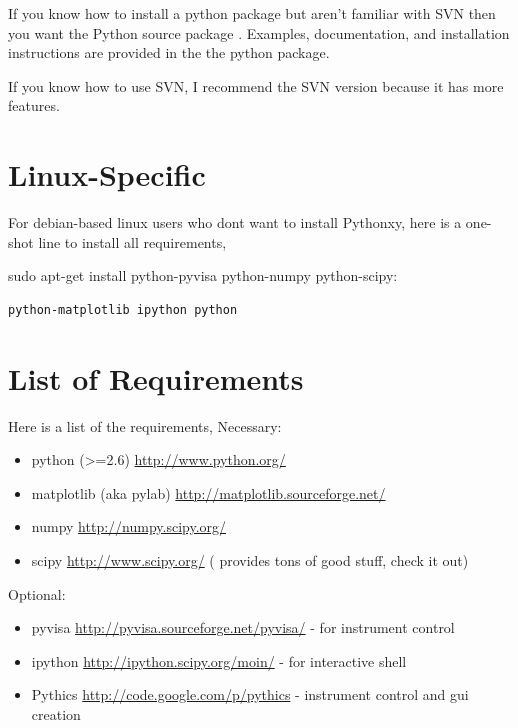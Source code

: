 \documentclass[letterpaper,10pt,english]{sphinxmanual}
\begin{document}
If you know how to install a python package but aren't familiar with SVN then you want the Python source package . Examples, documentation, and installation instructions are provided in the the python package.

If you know how to use SVN, I recommend the SVN version because it has more features.


\section{Linux-Specific}
\label{installation:linux-specific}
For debian-based linux users who dont want to install Pythonxy, here is a one-shot line to install all requirements,

sudo apt-get install python-pyvisa python-numpy python-scipy:

\begin{Verbatim}[commandchars=@\[\]]
python-matplotlib ipython python
\end{Verbatim}


\section{List of Requirements}
\label{installation:list-of-requirements}
Here is a list of the requirements, Necessary:
\begin{itemize}
\item {} 
python (\textgreater{}=2.6) \href{http://www.python.org/}{http://www.python.org/}

\item {} 
matplotlib (aka pylab) \href{http://matplotlib.sourceforge.net/}{http://matplotlib.sourceforge.net/}

\item {} 
numpy \href{http://numpy.scipy.org/}{http://numpy.scipy.org/}

\item {} 
scipy \href{http://www.scipy.org/}{http://www.scipy.org/} ( provides tons of good stuff, check it out)

\end{itemize}

Optional:
\begin{itemize}
\item {} 
pyvisa \href{http://pyvisa.sourceforge.net/pyvisa/}{http://pyvisa.sourceforge.net/pyvisa/} - for instrument control

\item {} 
ipython \href{http://ipython.scipy.org/moin/}{http://ipython.scipy.org/moin/} - for interactive shell

\item {} 
Pythics \href{http://code.google.com/p/pythics}{http://code.google.com/p/pythics} - instrument control and gui creation

\end{itemize}
\end{document}
